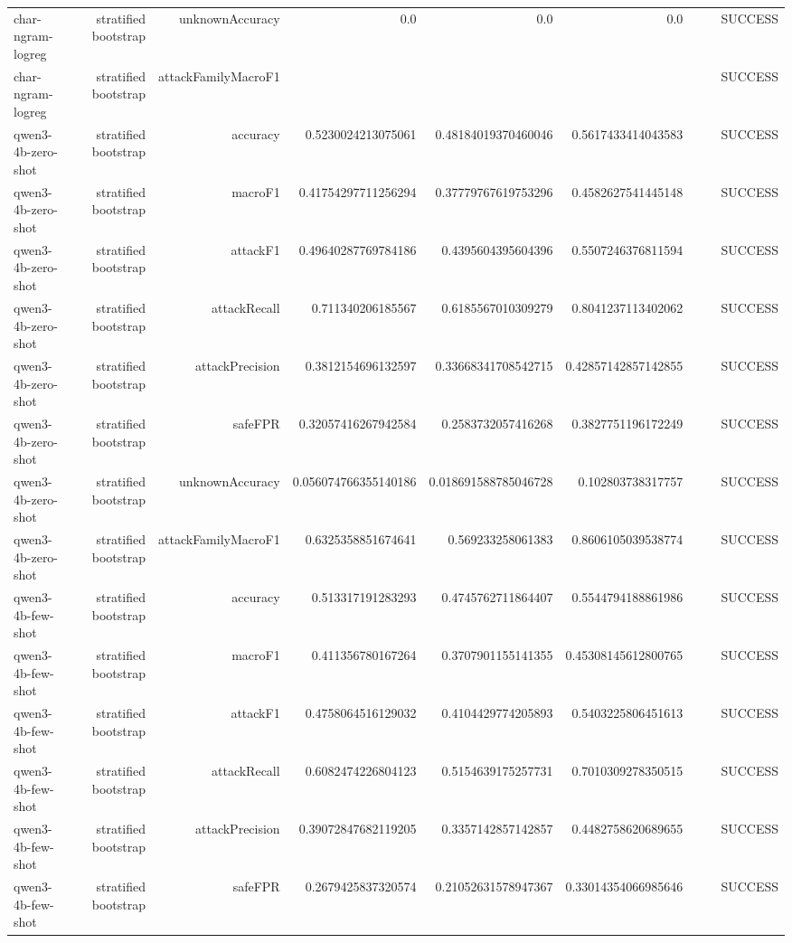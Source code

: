 \begin{table}[t]
\begin{tabular}{lrrrrrrrr}
char-ngram-logreg & stratified bootstrap & unknownAccuracy & 0.0 & 0.0 & 0.0 &  &  & SUCCESS \\
char-ngram-logreg & stratified bootstrap & attackFamilyMacroF1 &  &  &  &  &  & SUCCESS \\
qwen3-4b-zero-shot & stratified bootstrap & accuracy & 0.5230024213075061 & 0.48184019370460046 & 0.5617433414043583 &  &  & SUCCESS \\
qwen3-4b-zero-shot & stratified bootstrap & macroF1 & 0.41754297711256294 & 0.37779767619753296 & 0.4582627541445148 &  &  & SUCCESS \\
qwen3-4b-zero-shot & stratified bootstrap & attackF1 & 0.49640287769784186 & 0.4395604395604396 & 0.5507246376811594 &  &  & SUCCESS \\
qwen3-4b-zero-shot & stratified bootstrap & attackRecall & 0.711340206185567 & 0.6185567010309279 & 0.8041237113402062 &  &  & SUCCESS \\
qwen3-4b-zero-shot & stratified bootstrap & attackPrecision & 0.3812154696132597 & 0.33668341708542715 & 0.42857142857142855 &  &  & SUCCESS \\
qwen3-4b-zero-shot & stratified bootstrap & safeFPR & 0.32057416267942584 & 0.2583732057416268 & 0.3827751196172249 &  &  & SUCCESS \\
qwen3-4b-zero-shot & stratified bootstrap & unknownAccuracy & 0.056074766355140186 & 0.018691588785046728 & 0.102803738317757 &  &  & SUCCESS \\
qwen3-4b-zero-shot & stratified bootstrap & attackFamilyMacroF1 & 0.6325358851674641 & 0.569233258061383 & 0.8606105039538774 &  &  & SUCCESS \\
qwen3-4b-few-shot & stratified bootstrap & accuracy & 0.513317191283293 & 0.4745762711864407 & 0.5544794188861986 &  &  & SUCCESS \\
qwen3-4b-few-shot & stratified bootstrap & macroF1 & 0.411356780167264 & 0.3707901155141355 & 0.45308145612800765 &  &  & SUCCESS \\
qwen3-4b-few-shot & stratified bootstrap & attackF1 & 0.4758064516129032 & 0.4104429774205893 & 0.5403225806451613 &  &  & SUCCESS \\
qwen3-4b-few-shot & stratified bootstrap & attackRecall & 0.6082474226804123 & 0.5154639175257731 & 0.7010309278350515 &  &  & SUCCESS \\
qwen3-4b-few-shot & stratified bootstrap & attackPrecision & 0.39072847682119205 & 0.3357142857142857 & 0.4482758620689655 &  &  & SUCCESS \\
qwen3-4b-few-shot & stratified bootstrap & safeFPR & 0.2679425837320574 & 0.21052631578947367 & 0.33014354066985646 &  &  & SUCCESS \\

\end{tabular}
\end{table}

